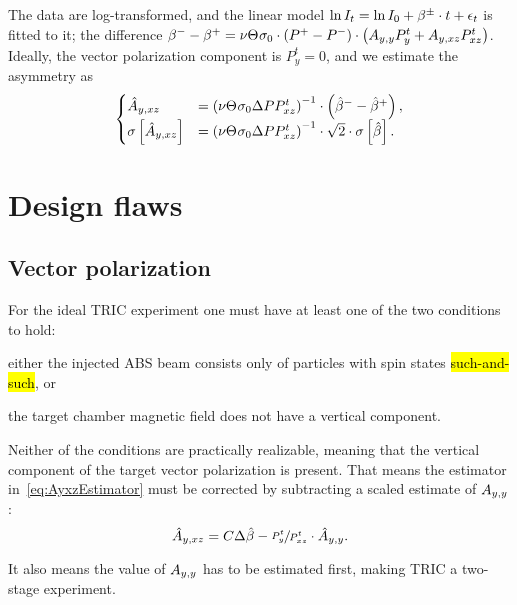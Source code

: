 \documentclass{article}
\begin{document}
The data are log-transformed, and the linear model $\ln I_t = \ln I_0 + \slp^\pm\cdot t + \err_t$ is fitted to it; the difference $\slp^- - \slp^+ = \nu\Thick\CS[0]\cdot\DP*\cdot\bkt{\Ayy P^t_y + \Ayxz P^t_{xz}}$. Ideally, the vector polarization component is $P^t_y = 0$, and we estimate the asymmetry as 
\begin{equation}\label{eq:AyxzEstimator}
\begin{cases}
	\Ayxz* 		&= \bkt{\nu\Thick\CS[0]\DP P^t_{xz}}^{-1}\cdot\bkt{\slp*^- - \slp*^+}, \\
	\SE{\Ayxz*} &= \bkt{\nu\Thick\CS[0]\DP P^t_{xz}}^{-1}\cdot\sqrt2\cdot\SE{\slp*}.
\end{cases}
\end{equation}
 
\section{Design flaws}
\subsection{Vector polarization}
For the ideal TRIC experiment one must have at least one of the two conditions to hold:
\begin{inparaenum}[1)]
	\item either the injected ABS beam consists only of particles with spin states \hl{such-and-such}, or
	\item the target chamber magnetic field does not have a vertical component.
\end{inparaenum}

Neither of the conditions are practically realizable, meaning that the vertical component of the target vector polarization is present. That means the estimator in~\eqref{eq:AyxzEstimator} must be corrected by subtracting a scaled estimate of $\Ayy$: 
\[
	\Ayxz* = C\Delta\slp* - \sfrac{P^t_y}{P^t_{xz}}\cdot\Ayy*.
\]

It also means the value of $\Ayy$ has to be estimated first, making TRIC a two-stage experiment.
\end{document}
